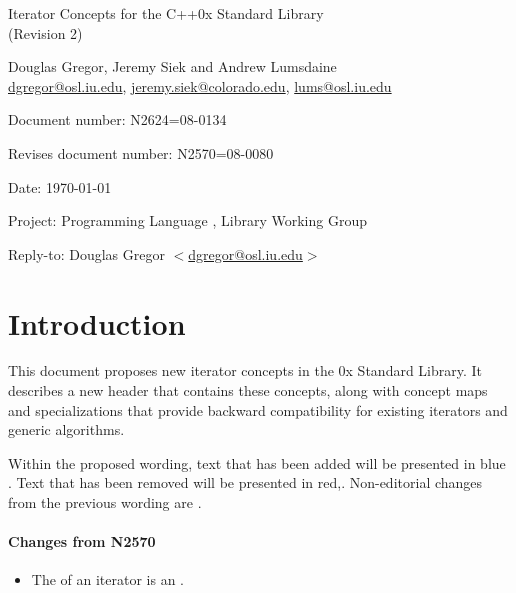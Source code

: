 \documentclass[american,twoside]{book}
\begin{document}
\raggedbottom

\begin{titlepage}
\begin{center}
\huge
Iterator Concepts for the C++0x Standard Library\\
(Revision 2)
\vspace{0.5in}

\normalsize
Douglas Gregor, Jeremy Siek and Andrew Lumsdaine \\
\href{mailto:dgregor@osl.iu.edu}{dgregor@osl.iu.edu}, \href{mailto:jeremy.siek@colorado.edu}{jeremy.siek@colorado.edu}, \href{mailto:lums@osl.iu.edu}{lums@osl.iu.edu}
\end{center}

\vspace{1in}
\par\noindent Document number: N2624=08-0134 \vspace{-6pt}
\par\noindent Revises document number: N2570=08-0080 \vspace{-6pt}
\par\noindent Date: \today\vspace{-6pt}
\par\noindent Project: Programming Language \Cpp{}, Library Working Group\vspace{-6pt}
\par\noindent Reply-to: Douglas Gregor $<$\href{mailto:dgregor@osl.iu.edu}{dgregor@osl.iu.edu}$>$\vspace{-6pt}

\section*{Introduction}
This document proposes new iterator concepts in the \Cpp0x Standard
Library. It describes a new header  that
contains these concepts, along with concept maps and
 specializations that provide backward
compatibility for existing iterators and generic algorithms.

Within the proposed wording, text that has been added
\textcolor{addclr}{will be presented in blue} . Text that has been removed will be
presented \textcolor{remclr}{in red},. Non-editorial
changes from the previous wording are . 


\paragraph*{Changes from N2570}
\begin{itemize}
\item The  of an iterator is an .
\end{itemize}

\end{titlepage}
\end{document}
